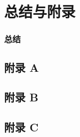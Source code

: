 
\section*{总结与附录}
\begin{frame}
  \frametitle{总结}
\end{frame}
\begin{frame}[c]
  \thankspage
\end{frame}
\subsection*{附录 A}
\frame{}%
\subsection*{附录 B}
\frame{}%
\subsection*{附录 C}
\frame{}%
